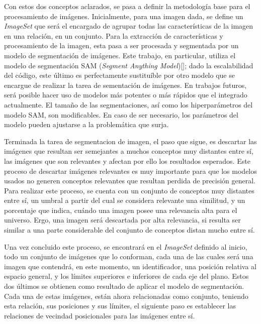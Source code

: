 Con estos dos conceptos aclarados, se pasa a definir la metodología base para el procesamiento de imágenes. Inicialmente, para una imagen dada, se define un \textit{ImageSet} que será el encargado de agrupar todas las características de la imagen en una relación, en un conjunto. Para la extracción de características y procesamiento de la imagen, esta pasa a ser procesada y segmentada por un modelo de segmentaci\'on de im\'agenes. Este trabajo, en particular, utiliza el modelo de segmentación SAM (\textit{Segment Anything Model})[\cite{huggingface2022sam}]; dado la escalabilidad del código, este \'ultimo es perfectamente sustituíble por otro modelo que se encargue de realizar la tarea de sementaci\'on de imágenes. En trabajos futuros, ser\'a posible hacer uso de modelos más potentes o más rápidos que el integrado actualmente. El tamaño de las segmentaciones, así como los hiperparámetros del modelo SAM, son modificables. En caso de ser necesario, los par\'ametros del modelo pueden ajustarse a la problem\'atica que surja.

Terminada la tarea de segmentacion de imagen, el paso que sigue, es descartar las imágenes que resultan ser semejantes a muchos conceptos muy distantes entre sí, las imágenes que son relevantes y afectan por ello los resultados esperados. Este proceso de descartar imágenes relevantes es muy importante para que los modelos usados no generen conceptos relevantes que resultan perdida de precisi\'on general. Para realizar este proceso, se cuenta con un conjunto de conceptos muy distantes entre sí, un umbral a partir del cual se considera relevante una similitud, y un porcentaje que indica, cu\'ando una imagen posee una relevancia alta para el universo. Ergo, una imagen ser\'a descartada por alta relevancia, si resulta ser similar a una parte considerable del conjunto de conceptos distan mucho entre s\'i.

Una vez concluido este proceso, se encontrará en el \textit{ImageSet} definido al inicio, todo un conjunto de imágenes que lo conforman, cada una de las cuales será una imagen que contendrá, en este momento, un identificador, una posición relativa al espacio general, y los límites superiores e inferiores de cada eje del plano. Estos dos últimos se obtienen como resultado de aplicar el modelo de segmentación. Cada una de estas imágenes, están ahora relacionadas como conjunto, teniendo esta relación, sus posiciones y sus límites, el siguiente paso es establecer las relaciones de vecindad posicionales para las imágenes entre s\'i.


